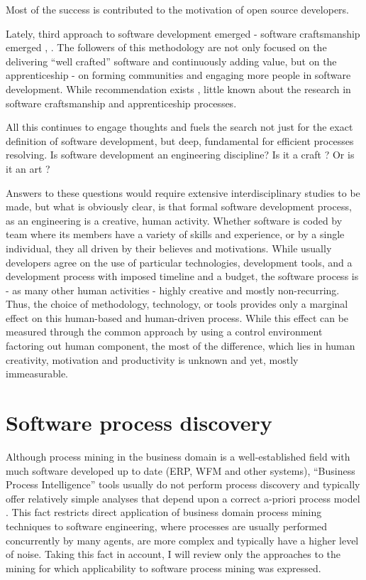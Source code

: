Most of the success is contributed to the motivation of open source developers.

Lately, third approach to software development emerged - software craftsmanship emerged 
\cite{citeulike:11058561}, \cite{citeulike:11058554}. The followers of this methodology 
are not only focused on the delivering ``well crafted'' software and continuously adding value,
but on the apprenticeship - on forming communities and engaging more people in software development.
While recommendation exists \cite{citeulike:11058784}, little known about the research 
in software craftsmanship and apprenticeship processes.

All this continues to engage thoughts and fuels the search not just for the exact definition 
of software development, but deep, fundamental for efficient processes resolving. 
Is software development an engineering discipline? Is it a craft \cite{citeulike:5203446}? 
Or is it an art \cite{citeulike:11045694}?

Answers to these questions would require extensive interdisciplinary studies to be made, 
but what is obviously clear, is that formal software development process, as an engineering 
is a creative, human activity. 
Whether software is coded 
by team where its members have a variety of skills and experience, or by a single individual,
they all driven by their believes and motivations. While usually developers agree on the use of 
particular technologies, development tools, and a development process with imposed timeline and 
a budget, the software process is - as many other human activities - highly creative and mostly 
non-recurring. Thus, the choice of methodology, technology, or tools provides only a marginal 
effect on this human-based and human-driven process. While this effect can be measured through 
the common approach by using a control environment factoring out human component, the most of 
the difference, which lies in human creativity, motivation and productivity is unknown and yet, 
mostly immeasurable.

\section{Software process discovery}\label{process.discovery} 
Although process mining in the business domain is a well-established field with much software developed up to date (ERP, WFM and other systems), ``Business Process Intelligence'' tools usually do not perform process discovery and typically offer relatively simple analyses that depend upon a correct a-priori process model \cite{citeulike:3718014} \cite{citeulike:5044991}. This fact restricts direct application of business domain process mining techniques to software engineering, where processes are usually performed concurrently by many agents, are more complex and typically have a higher level of noise. Taking this fact in account, I will review only the approaches to the mining for which applicability to software process mining was expressed. 

